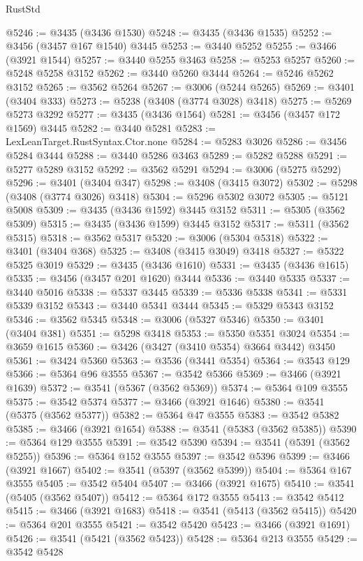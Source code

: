 \begin{lexlean}{RustStd}
\begin{coremodule}
@5246 := @3435 (@3436 @1530)
@5248 := @3435 (@3436 @1535)
@5252 := @3456 (@3457 @167 @1540) @3445
@5253 := @3440 @5252
@5255 := @3466 (@3921 @1544)
@5257 := @3440 @5255 @3463
@5258 := @5253 @5257
@5260 := @5248 @5258 @3152
@5262 := @3440 @5260 @3444
@5264 := @5246 @5262 @3152
@5265 := @3562 @5264
@5267 := @3006 (@5244 @5265)
@5269 := @3401 (@3404 @333)
@5273 := @5238 (@3408 (@3774 @3028) @3418)
@5275 := @5269 @5273 @3292
@5277 := @3435 (@3436 @1564)
@5281 := @3456 (@3457 @172 @1569) @3445
@5282 := @3440 @5281
@5283 := LexLeanTarget.RustSyntax.Ctor.none
@5284 := @5283 @3026
@5286 := @3456 @5284 @3444
@5288 := @3440 @5286 @3463
@5289 := @5282 @5288
@5291 := @5277 @5289 @3152
@5292 := @3562 @5291
@5294 := @3006 (@5275 @5292)
@5296 := @3401 (@3404 @347)
@5298 := @3408 (@3415 @3072)
@5302 := @5298 (@3408 (@3774 @3026) @3418)
@5304 := @5296 @5302 @3072
@5305 := @5121 @5008
@5309 := @3435 (@3436 @1592) @3445 @3152
@5311 := @5305 (@3562 @5309)
@5315 := @3435 (@3436 @1599) @3445 @3152
@5317 := @5311 (@3562 @5315)
@5318 := @3562 @5317
@5320 := @3006 (@5304 @5318)
@5322 := @3401 (@3404 @368)
@5325 := @3408 (@3415 @3049) @3418
@5327 := @5322 @5325 @3019
@5329 := @3435 (@3436 @1610)
@5331 := @3435 (@3436 @1615)
@5335 := @3456 (@3457 @201 @1620) @3444
@5336 := @3440 @5335
@5337 := @3440 @5016
@5338 := @5337 @3445
@5339 := @5336 @5338
@5341 := @5331 @5339 @3152
@5343 := @3440 @5341 @3444
@5345 := @5329 @5343 @3152
@5346 := @3562 @5345
@5348 := @3006 (@5327 @5346)
@5350 := @3401 (@3404 @381)
@5351 := @5298 @3418
@5353 := @5350 @5351 @3024
@5354 := @3659 @1615
@5360 := @3426 (@3427 (@3410 @5354) @3664 @3442) @3450
@5361 := @3424 @5360
@5363 := @3536 (@3441 @5354)
@5364 := @3543 @129
@5366 := @5364 @96 @3555
@5367 := @3542 @5366
@5369 := @3466 (@3921 @1639)
@5372 := @3541 (@5367 (@3562 @5369))
@5374 := @5364 @109 @3555
@5375 := @3542 @5374
@5377 := @3466 (@3921 @1646)
@5380 := @3541 (@5375 (@3562 @5377))
@5382 := @5364 @47 @3555
@5383 := @3542 @5382
@5385 := @3466 (@3921 @1654)
@5388 := @3541 (@5383 (@3562 @5385))
@5390 := @5364 @129 @3555
@5391 := @3542 @5390
@5394 := @3541 (@5391 (@3562 @5255))
@5396 := @5364 @152 @3555
@5397 := @3542 @5396
@5399 := @3466 (@3921 @1667)
@5402 := @3541 (@5397 (@3562 @5399))
@5404 := @5364 @167 @3555
@5405 := @3542 @5404
@5407 := @3466 (@3921 @1675)
@5410 := @3541 (@5405 (@3562 @5407))
@5412 := @5364 @172 @3555
@5413 := @3542 @5412
@5415 := @3466 (@3921 @1683)
@5418 := @3541 (@5413 (@3562 @5415))
@5420 := @5364 @201 @3555
@5421 := @3542 @5420
@5423 := @3466 (@3921 @1691)
@5426 := @3541 (@5421 (@3562 @5423))
@5428 := @5364 @213 @3555
@5429 := @3542 @5428

\end{coremodule}
\end{lexlean}
